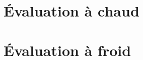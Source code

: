 \documentclass[asi, sansVersion]{picInsa}
\begin{document}
	\newpage
	\section*{Évaluation à chaud}
			
			
	\newpage
	\section*{Évaluation à froid}
\end{document}
